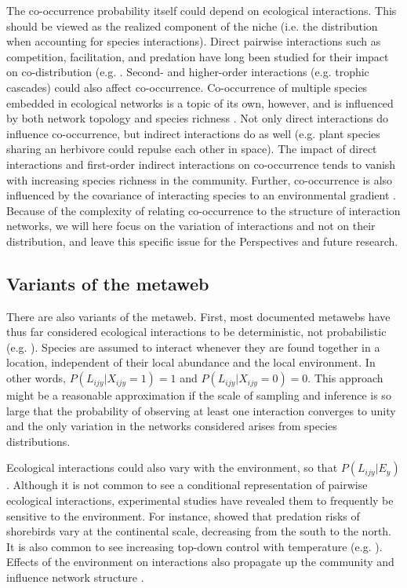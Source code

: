 \documentclass[12pt]{article}
\begin{document}
The co-occurrence probability itself could depend on ecological interactions.
This should be viewed as the realized component of the niche (i.e. the
distribution when accounting for species interactions). Direct pairwise
interactions such as competition, facilitation, and predation have long been
studied for their impact on co-distribution (e.g. \citealt{Diamond1976, Connor1980,
Gotelli2000}. Second- and higher-order interactions (e.g. trophic cascades)
could also affect co-occurrence. Co-occurrence of multiple species embedded in
ecological networks is a topic of its own, however, and is influenced by both network
topology and species richness \citep{Cazelles2016}. Not only direct interactions do
influence co-occurrence, but indirect interactions do as well (e.g. plant species
sharing an herbivore could repulse each other in space). The impact of direct
interactions and first-order indirect interactions on co-occurrence tends to
vanish with increasing species richness in the community. Further, co-occurrence
is also influenced by the covariance of interacting species to an
environmental gradient \citep{Cazelles2015}. Because of the complexity of relating
co-occurrence to the structure of interaction networks, we will here focus on
the variation of interactions and not on their distribution, and leave this
specific issue for the Perspectives and future research.

\subsection*{Variants of the metaweb}

There are also variants of the metaweb. First, most documented metawebs have
thus far considered ecological interactions to be deterministic, not
probabilistic (e.g. \citealt{Havens1992, Wood2015}). Species are assumed to interact
whenever they are found together in a location, independent of their
local abundance and the local environment. In other words, $P(L_{ijy}|X_{ijy}=1) = 1$
and $P(L_{ijy}|X_{ijy}=0) = 0$. This approach might be a reasonable
approximation if the scale of sampling and inference is so large that the
probability of observing at least one interaction converges to unity and the
only variation in the networks considered arises from species distributions.

Ecological interactions could also vary with the environment, so that $P(L_{ijy}
|E_y)$. Although it is not common to see a conditional representation of
pairwise ecological interactions, experimental studies have revealed them to
frequently be sensitive to the environment. For instance, \citep{Mckinnon2010} showed
that predation risks of shorebirds vary at the continental scale, decreasing
from the south to the north. It is also common to see increasing top-down
control with temperature (e.g. \citealt{Shurin2012, Gray2016}). Effects of the
environment on interactions also propagate up the community and influence network
structure \citep{Tylianakis2007, Woodward2010; Petchey2010; Lelong2015}.
\end{document}
